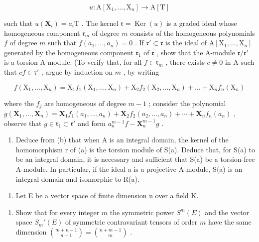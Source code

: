 \[
u: \mathrm{A} [ \mathrm{X} _ {1}, \dots , \mathrm{X} _ {n} ] \rightarrow \mathrm{A} [ \mathrm{T} ]
\]

such that \(u(\mathbf{X}_i) = a_i\mathrm{T}\) . The kernel \(\mathfrak{r} = \operatorname{Ker}(u)\) is a graded ideal whose homogeneous component \(\mathfrak{r}_m\) of degree \(m\) consists of the homogeneous polynomials \(f\) of degree \(m\) such that \(f(a_1, \ldots, a_n) = 0\) . If \(\mathfrak{r}' \subset \mathfrak{r}\) is the ideal of \(\mathrm{A}[\mathrm{X}_1, \ldots, \mathrm{X}_n]\) generated by the homogeneous component \(\mathfrak{r}_1\) of \(\mathfrak{r}\) , show that the A-module \(\mathfrak{r}/\mathfrak{r}'\) is a torsion A-module. (To verify that, for all \(f \in \mathfrak{r}_m\) , there exists \(c \neq 0\) in A such that \(cf \in \mathfrak{r}'\) , argue by induction on \(m\) , by writing

\[
f \left(\mathrm{X} _ {1}, \dots , \mathrm{X} _ {n}\right) = \mathrm{X} _ {1} f _ {1} \left(\mathrm{X} _ {1}, \dots , \mathrm{X} _ {n}\right) + \mathrm{X} _ {2} f _ {2} \left(\mathrm{X} _ {2}, \dots , \mathrm{X} _ {n}\right) + \dots + \mathrm{X} _ {n} f _ {n} \left(\mathrm{X} _ {n}\right)
\]

where the \(f_{j}\) are homogeneous of degree \(m - 1\) ; consider the polynomial \(g(\mathbf{X}_1, \ldots, \mathbf{X}_n) = \mathbf{X}_1 f_1(a_1, \ldots, a_n) + \mathbf{X}_2 f_2(a_2, \ldots, a_n) + \cdots + \mathbf{X}_n f_n(a_n)\) , observe that \(g \in \mathfrak{r}_1 \subset \mathfrak{r}'\) and form \(a_n^{m-1} f - \mathbf{X}_n^{m-1} g\) .

\begin{enumerate}
\def\labelenumi{(\alph{enumi})}
\setcounter{enumi}{2}
\tightlist
\item
  Deduce from (b) that when A is an integral domain, the kernel of the homomorphism r of (a) is the torsion module of S(a). Deduce that, for S(a) to be an integral domain, it is necessary and sufficient that S(a) be a torsion-free A-module. In particular, if the ideal a is a projective A-module, S(a) is an integral domain and isomorphic to R(a).
\end{enumerate}

\begin{enumerate}
\def\labelenumi{\arabic{enumi}.}
\setcounter{enumi}{4}
\tightlist
\item
  Let E be a vector space of finite dimension n over a field K.
\end{enumerate}

\begin{enumerate}
\def\labelenumi{(\alph{enumi})}
\tightlist
\item
  Show that for every integer \(m\) the symmetric power \(S^m(E)\) and the vector space \(S_m'(E)\) of symmetric contravariant tensors of order \(m\) have the same dimension \(\binom{m + n - 1}{n - 1} = \binom{n + m - 1}{m}\) .
\end{enumerate}

